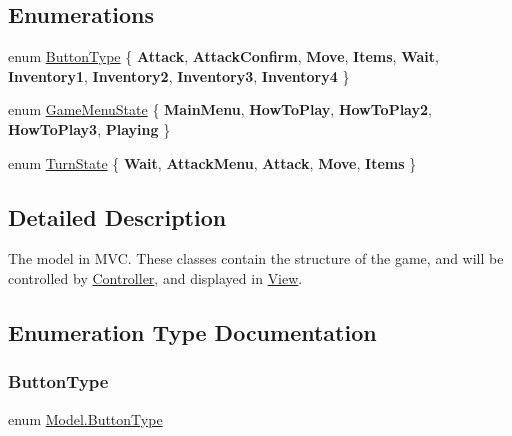 \subsection*{Enumerations}
\begin{DoxyCompactItemize}
\item 
enum \hyperlink{namespace_model_ac76b3489c9d704f49912608bd36cd0e7}{Button\+Type} \{ \newline
{\bfseries Attack}, 
{\bfseries Attack\+Confirm}, 
{\bfseries Move}, 
{\bfseries Items}, 
\newline
{\bfseries Wait}, 
{\bfseries Inventory1}, 
{\bfseries Inventory2}, 
{\bfseries Inventory3}, 
\newline
{\bfseries Inventory4}
 \}
\item 
enum \hyperlink{namespace_model_a37db30f781c99ca4eb226b512958bded}{Game\+Menu\+State} \{ \newline
{\bfseries Main\+Menu}, 
{\bfseries How\+To\+Play}, 
{\bfseries How\+To\+Play2}, 
{\bfseries How\+To\+Play3}, 
\newline
{\bfseries Playing}
 \}
\item 
enum \hyperlink{namespace_model_abc9786019e8deab9844b28c3d9c58f86}{Turn\+State} \{ \newline
{\bfseries Wait}, 
{\bfseries Attack\+Menu}, 
{\bfseries Attack}, 
{\bfseries Move}, 
\newline
{\bfseries Items}
 \}
\end{DoxyCompactItemize}


\subsection{Detailed Description}
The model in M\+VC. These classes contain the structure of the game, and will be controlled by \hyperlink{namespace_controller}{Controller}, and displayed in \hyperlink{namespace_view}{View}. 



\subsection{Enumeration Type Documentation}
\hypertarget{namespace_model_ac76b3489c9d704f49912608bd36cd0e7}{}\label{namespace_model_ac76b3489c9d704f49912608bd36cd0e7} 
\subsubsection{\texorpdfstring{Button\+Type}{ButtonType}}
{\footnotesize\ttfamily enum \hyperlink{namespace_model_ac76b3489c9d704f49912608bd36cd0e7}{Model.\+Button\+Type}\hspace{0.3cm}{\ttfamily [strong]}}

